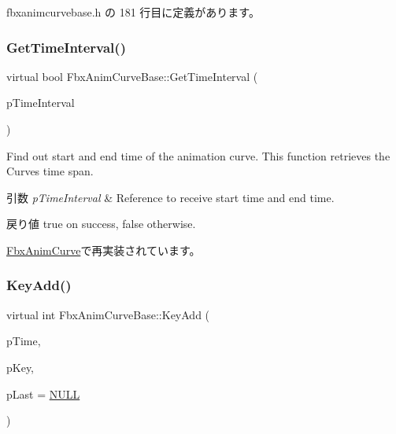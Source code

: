  fbxanimcurvebase.\+h の 181 行目に定義があります。

\mbox{\label{class_fbx_anim_curve_base_a4d259319e514c5371ff184b0cc7f7cd6}} 
\subsubsection{\texorpdfstring{Get\+Time\+Interval()}{GetTimeInterval()}}
{\footnotesize\ttfamily virtual bool Fbx\+Anim\+Curve\+Base\+::\+Get\+Time\+Interval (\begin{DoxyParamCaption}\item[{\hyperlink{class_fbx_time_span}{Fbx\+Time\+Span} \&}]{p\+Time\+Interval }\end{DoxyParamCaption})\hspace{0.3cm}{\ttfamily [virtual]}}

Find out start and end time of the animation curve. This function retrieves the Curve\textquotesingle{}s time span. 
\begin{DoxyParams}{引数}
{\em p\+Time\+Interval} & Reference to receive start time and end time. \\
\hline
\end{DoxyParams}
\begin{DoxyReturn}{戻り値}
{\ttfamily true} on success, {\ttfamily false} otherwise. 
\end{DoxyReturn}


\hyperlink{class_fbx_anim_curve_aa547431c44acd9eb28aebdec1a142501}{Fbx\+Anim\+Curve}で再実装されています。

\mbox{\label{class_fbx_anim_curve_base_a3e502968be213bd5cfde287f66f97cf5}} 
\subsubsection{\texorpdfstring{Key\+Add()}{KeyAdd()}}
{\footnotesize\ttfamily virtual int Fbx\+Anim\+Curve\+Base\+::\+Key\+Add (\begin{DoxyParamCaption}\item[{\hyperlink{class_fbx_time}{Fbx\+Time}}]{p\+Time,  }\item[{\hyperlink{class_fbx_anim_curve_key_base}{Fbx\+Anim\+Curve\+Key\+Base} \&}]{p\+Key,  }\item[{int $\ast$}]{p\+Last = {\ttfamily \hyperlink{fbxarch_8h_a070d2ce7b6bb7e5c05602aa8c308d0c4}{N\+U\+LL}} }\end{DoxyParamCaption})\hspace{0.3cm}{\ttfamily [pure virtual]}}

